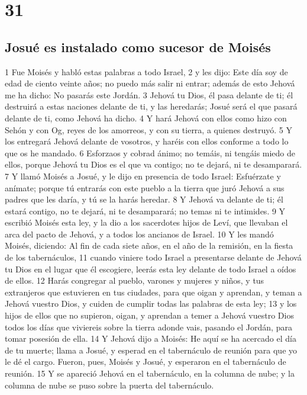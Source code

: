 \chapter{31}


\section{Josué es instalado como sucesor de Moisés}


1 Fue Moisés y habló estas palabras a todo Israel,
2 y les dijo: Este día soy de edad de ciento veinte años; no puedo más salir ni entrar; además de esto Jehová me ha dicho: No pasarás este Jordán.
3 Jehová tu Dios, él pasa delante de ti; él destruirá a estas naciones delante de ti, y las heredarás; Josué será el que pasará delante de ti, como Jehová ha dicho.
4 Y hará Jehová con ellos como hizo con Sehón y con Og, reyes de los amorreos, y con su tierra, a quienes destruyó. 
5 Y los entregará Jehová delante de vosotros, y haréis con ellos conforme a todo lo que os he mandado.
6 Esforzaos y cobrad ánimo; no temáis, ni tengáis miedo de ellos, porque Jehová tu Dios es el que va contigo; no te dejará, ni te desamparará.
7 Y llamó Moisés a Josué, y le dijo en presencia de todo Israel: Esfuérzate y anímate; porque tú entrarás con este pueblo a la tierra que juró Jehová a sus padres que les daría, y tú se la harás heredar.
8 Y Jehová va delante de ti; él estará contigo, no te dejará, ni te desamparará; no temas ni te intimides.
9 Y escribió Moisés esta ley, y la dio a los sacerdotes hijos de Leví, que llevaban el arca del pacto de Jehová, y a todos los ancianos de Israel. 
10 Y les mandó Moisés, diciendo: Al fin de cada siete años, en el año de la remisión, en la fiesta de los tabernáculos, 
11 cuando viniere todo Israel a presentarse delante de Jehová tu Dios en el lugar que él escogiere, leerás esta ley delante de todo Israel a oídos de ellos.
12 Harás congregar al pueblo, varones y mujeres y niños, y tus extranjeros que estuvieren en tus ciudades, para que oigan y aprendan, y teman a Jehová vuestro Dios, y cuiden de cumplir todas las palabras de esta ley;
13 y los hijos de ellos que no supieron, oigan, y aprendan a temer a Jehová vuestro Dios todos los días que viviereis sobre la tierra adonde vais, pasando el Jordán, para tomar posesión de ella.
14 Y Jehová dijo a Moisés: He aquí se ha acercado el día de tu muerte; llama a Josué, y esperad en el tabernáculo de reunión para que yo le dé el cargo. Fueron, pues, Moisés y Josué, y esperaron en el tabernáculo de reunión.
15 Y se apareció Jehová en el tabernáculo, en la columna de nube; y la columna de nube se puso sobre la puerta del tabernáculo.
